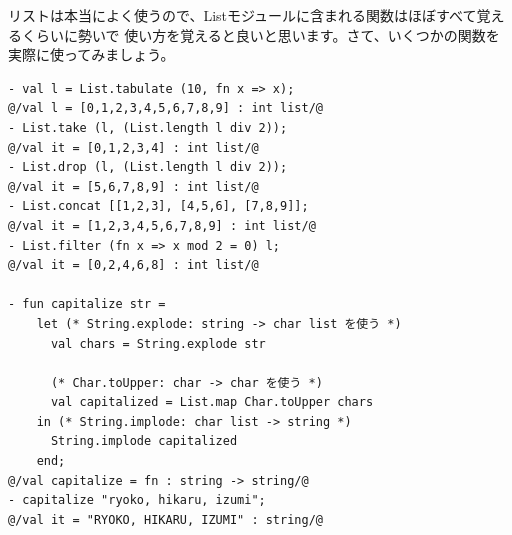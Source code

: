 \documentclass[11pt,a4paper]{jarticle}
\begin{document}
リストは本当によく使うので、Listモジュールに含まれる関数はほぼすべて覚えるくらいに勢いで
使い方を覚えると良いと思います。さて、いくつかの関数を実際に使ってみましょう。

\begin{lstlisting}[caption=Listモジュール,label=code:list-mod]
- val l = List.tabulate (10, fn x => x);
@/val l = [0,1,2,3,4,5,6,7,8,9] : int list/@
- List.take (l, (List.length l div 2));
@/val it = [0,1,2,3,4] : int list/@
- List.drop (l, (List.length l div 2));
@/val it = [5,6,7,8,9] : int list/@
- List.concat [[1,2,3], [4,5,6], [7,8,9]];
@/val it = [1,2,3,4,5,6,7,8,9] : int list/@
- List.filter (fn x => x mod 2 = 0) l;
@/val it = [0,2,4,6,8] : int list/@

- fun capitalize str =
    let (* String.explode: string -> char list を使う *)
      val chars = String.explode str

      (* Char.toUpper: char -> char を使う *)
      val capitalized = List.map Char.toUpper chars
    in (* String.implode: char list -> string *)
      String.implode capitalized
    end;
@/val capitalize = fn : string -> string/@
- capitalize "ryoko, hikaru, izumi";
@/val it = "RYOKO, HIKARU, IZUMI" : string/@
\end{lstlisting}
\end{document}
